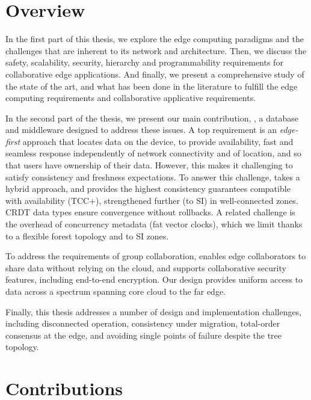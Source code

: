 \section{Overview}
\label{sec:intro:overview}

In the first part of this thesis,
we explore the edge computing paradigms and the challenges that are
inherent to its network and architecture.
Then, we discuss the safety, scalability, security, hierarchy and 
programmability requirements for collaborative 
edge applications.
And finally, we present a comprehensive study of the state of the art,
and what has been done in the literature to fulfill the edge computing 
requirements and collaborative applicative requirements. 

In the second part of the thesis,
we present our main contribution, \system{},
a database and middleware designed to address these issues.
A top requirement is an \emph{edge-first} approach \cite{rep:app:1827}
that locates data on the device, to provide availability, fast and
seamless response independently of network connectivity and of location,
and so that users have ownership of their data.
However, this makes it challenging to satisfy consistency and freshness
expectations.
To answer this challenge, \system{} takes a hybrid approach, and
provides the highest consistency guarantees compatible with availability
(TCC+), strengthened further (to SI) in well-connected zones.
CRDT data types ensure convergence without rollbacks.
A related challenge is the overhead of concurrency metadata
(fat vector clocks), which we limit thanks to a flexible forest
topology and to SI zones.

To address the requirements of group collaboration, \system{}
enables edge collaborators to share data without relying on the cloud,
and supports collaborative security features, including end-to-end
encryption.
Our design provides uniform access to data across a spectrum spanning
core cloud to the far edge.

Finally, this thesis addresses a number of design and implementation
challenges, including disconnected operation, consistency under
migration, total-order consensus at the edge, and avoiding single points of
failure despite the tree topology.

\section{Contributions}
\label{sec:intro:contributions}

